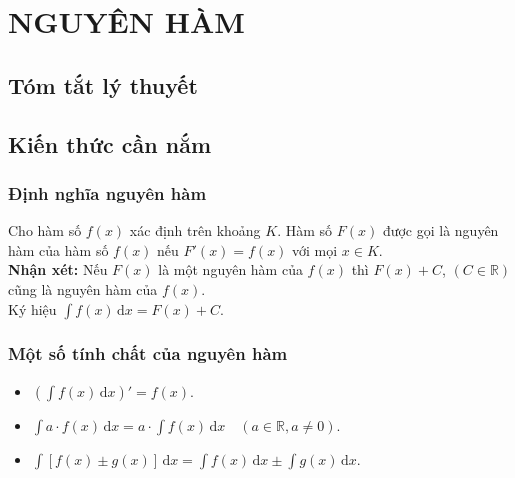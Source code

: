 \section{NGUYÊN HÀM}
\subsection{Tóm tắt lý thuyết}
\subsection{Kiến thức cần nắm}
\subsubsection{Định nghĩa nguyên hàm}
Cho hàm số $f(x)$ xác định trên khoảng $K$. Hàm số $F(x)$ được gọi là nguyên hàm của hàm số $f(x)$ nếu $F'(x)=f(x)$ với mọi $x\in K$.\\
\textbf{Nhận xét:} Nếu $F(x)$ là một nguyên hàm của $f(x)$ thì $F(x)+C$, $(C\in\mathbb{R})$ cũng là nguyên hàm của $f(x)$.\\
Ký hiệu $\displaystyle\int f(x)\mathrm{\,d}x=F(x)+C$.\\
\subsubsection{Một số tính chất của nguyên hàm}
\begin{itemize}
	\item $\left(\displaystyle\int f(x)\mathrm{\,d}x\right)'=f(x)$.
	\item $\displaystyle\int a\cdot f(x)\mathrm{\,d}x=a\cdot\displaystyle\int f(x)\mathrm{\,d}x\quad\left(a\in\mathbb{R}, a\neq 0\right)$.
	\item $\displaystyle\int\left[f(x)\pm g(x)\right]\mathrm{\,d}x=\displaystyle\int f(x)\mathrm{\,d}x\pm\displaystyle\int g(x)\mathrm{\,d}x$.
\end{itemize}
